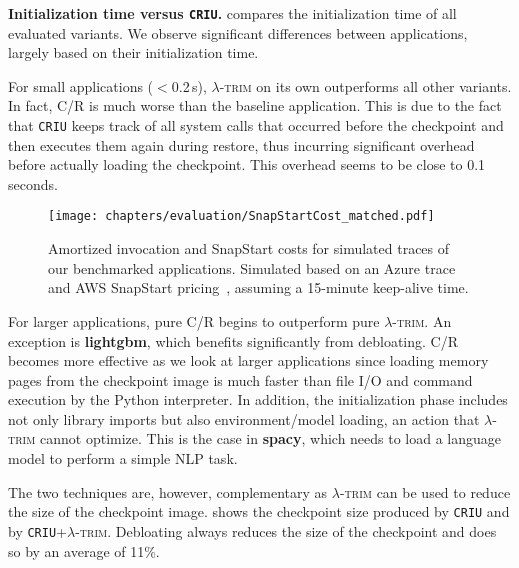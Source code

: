 \documentclass[sigplan,nonacm]{acmart}
\newcommand{\sys}{\textsc{\ensuremath{\lambda}-trim}\xspace}
\newcommand{\heading}[1]{\vspace{4pt}\noindent\textbf{#1.}}
\newcommand{\application}[1]{{\textcolor{pennblue}{\textbf{#1}}}}
\begin{document}
\heading{Initialization time versus \texttt{CRIU}}
 compares the initialization time of all evaluated variants.
We observe significant differences between applications, largely based on their initialization time.

For small applications ($<$0.2\,s), \sys on its own outperforms all other variants.
In fact, C/R is much worse than the baseline application.
This is due to the fact that \texttt{CRIU} keeps track of all system calls that occurred before the checkpoint and then executes them again during restore, thus incurring significant overhead before actually loading the checkpoint.
This overhead seems to be close to 0.1 seconds.

\begin{figure*}[t!]
  \centering
    
    \texttt{[image: chapters/evaluation/SnapStartCost\_matched.pdf]}

\vspace{-0.7em}
  \caption{Amortized invocation and SnapStart costs for simulated traces of our benchmarked applications.
Simulated based on an Azure trace~\cite{wild2020} and AWS SnapStart pricing~\cite{sspricing}, assuming a 15-minute keep-alive time.}
  \label{fig:snapstartcost}
\end{figure*}

For larger applications, pure C/R begins to outperform pure \sys.
An exception is \application{lightgbm}, which benefits significantly from debloating.
C/R becomes more effective as we look at larger applications 
since loading memory pages from the checkpoint image is much faster than file I/O and command execution by the Python interpreter.
In addition, the initialization phase includes not only library imports but also environment/model loading, an action that \sys cannot optimize.
This is the case in \application{spacy}, which needs to load a language model to perform a simple NLP task.










The two techniques are, however, complementary as \sys can be used to reduce the size of the checkpoint image.
 shows the checkpoint size produced by \texttt{CRIU} and by \texttt{CRIU}+\sys.
Debloating always reduces the size of the checkpoint and does so by an average of 11\%.
\end{document}
